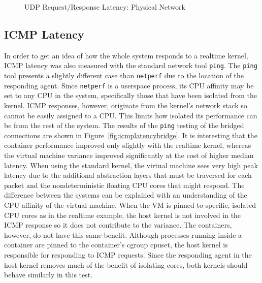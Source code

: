 \begin{figure}
    \centering
    \def\svgwidth{\columnwidth}
    
    \caption{UDP Request/Response Latency: Physical Network}
    \label{fig:udp_rr_phys}
\end{figure}


\subsection{ICMP Latency} %
\label{sub:icmplatency}

In order to get an idea of how the whole system responds to a realtime kernel, ICMP latency was also measured with the standard network tool \texttt{ping}.  
The \texttt{ping} tool presents a slightly different case than \texttt{netperf} due to the location of the responding agent.  
Since \texttt{netperf} is a userspace process, its CPU affinity may be set to any CPU in the system, specifically those that have been isolated from the kernel.
ICMP responses, however, originate from the kernel's network stack so cannot be easily assigned to a CPU.
This limits how isolated its performance can be from the rest of the system.
The results of the \texttt{ping} testing of the bridged connections are shown in Figure~\ref{fig:icmplatencybridge}.
It is interesting that the container performance improved only slightly with the realtime kernel, whereas the virtual machine variance improved significantly at the cost of higher median latency.  
When using the standard kernel, the virtual machine sees very high peak latency due to the additional abstraction layers that must be traversed for each packet and the nondeterministic floating CPU cores that might respond.
The difference between the systems can be explained with an understanding of the CPU affinity of the virtual machine.  
When the VM is pinned to specific, isolated CPU cores as in the realtime example, the host kernel is not involved in the ICMP response so it does not contribute to the variance.
The containers, however, do not have this same benefit.
Although processes running inside a container are pinned to the container's cgroup cpuset, the host kernel is responsible for responding to ICMP requests.
Since the responding agent in the host kernel removes much of the benefit of isolating cores, both kernels should behave similarly in this test.

